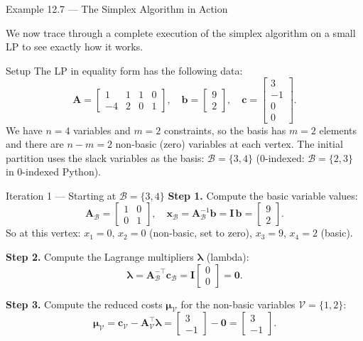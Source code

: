 \documentclass[aspectratio=169,10pt]{beamer}
\newcommand{\xv}{\mathbf{x}}
\newcommand{\cv}{\mathbf{c}}
\newcommand{\bv}{\mathbf{b}}
\newcommand{\Av}{\mathbf{A}}
\newcommand{\muv}{\boldsymbol{\mu}}
\newcommand{\lav}{\boldsymbol{\lambda}}
\newcommand{\calB}{\mathcal{B}}
\newcommand{\calV}{\mathcal{V}}
\begin{document}
\begin{frame}[allowframebreaks]{Example 12.7 --- The Simplex Algorithm in Action}

We now trace through a complete execution of the simplex algorithm on a small LP
to see exactly how it works.

\begin{exampleblock}{Setup}
The LP in equality form has the following data:
\[
  \Av = \begin{bmatrix}1&1&1&0\\-4&2&0&1\end{bmatrix},\quad
  \bv = \begin{bmatrix}9\\2\end{bmatrix},\quad
  \cv = \begin{bmatrix}3\\-1\\0\\0\end{bmatrix}.
\]
We have $n = 4$ variables and $m = 2$ constraints, so the basis has $m = 2$ elements
and there are $n - m = 2$ non-basic (zero) variables at each vertex.
The initial partition uses the slack variables as the basis:
$\calB = \{3, 4\}$ (0-indexed: $\calB = \{2, 3\}$ in 0-indexed Python).
\end{exampleblock}

\begin{exampleblock}{Iteration 1 --- Starting at $\calB = \{3,4\}$}
\textbf{Step 1.} Compute the basic variable values:
\[
  \Av_\calB = \begin{bmatrix}1&0\\0&1\end{bmatrix},\quad
  \xv_\calB = \Av_\calB^{-1}\bv = \mathbf{I}\,\bv = \begin{bmatrix}9\\2\end{bmatrix}.
\]
So at this vertex: $x_1 = 0$, $x_2 = 0$ (non-basic, set to zero),
$x_3 = 9$, $x_4 = 2$ (basic).

\textbf{Step 2.} Compute the Lagrange multipliers $\lav$ (lambda):
\[
  \lav = \Av_\calB^{-\top}\cv_\calB = \mathbf{I}\begin{bmatrix}0\\0\end{bmatrix} = \mathbf{0}.
\]

\textbf{Step 3.} Compute the reduced costs $\muv_\calV$ for the non-basic variables
$\calV = \{1, 2\}$:
\[
  \muv_\calV = \cv_\calV - \Av_\calV^\top\lav
  = \begin{bmatrix}3\\-1\end{bmatrix} - \mathbf{0}
  = \begin{bmatrix}3\\-1\end{bmatrix}.
\]


\end{exampleblock}
\end{frame}
\end{document}
